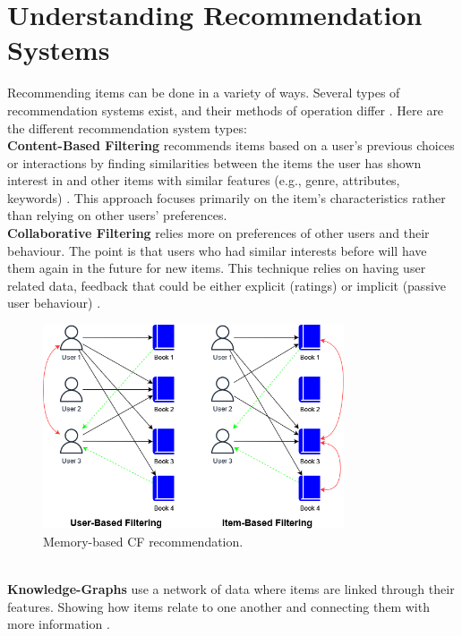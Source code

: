 \documentclass[conference]{IEEEtran}
\begin{document}
\section{Understanding Recommendation Systems}
Recommending items can be done in a variety of ways. Several types of recommendation systems exist, and their methods of operation differ \cite{Roy2022}. Here are the different recommendation system types:\\
%
%
\textbf{Content-Based Filtering} recommends items based on a user's previous choices or interactions by finding similarities between the items the user has shown interest in and other items with similar features (e.g., genre, attributes, keywords) \cite{pub.1034486657}.
This approach focuses primarily on the item's characteristics rather than relying on other users' preferences.\\
\textbf{Collaborative Filtering} relies more on preferences of other users and their behaviour. The point is that users who had similar interests before will have them again in the future for new items. This technique relies on having user related data, feedback that could be either explicit (ratings) or implicit (passive user behaviour) \cite{NILASHI2018507}.
%
\begin{figure}[!htb]
\centering
\includegraphics[width=3.5in]{img/collaborative_example.png}
\caption{Memory-based CF recommendation.}
\label{fig:collaborative_example}
\end{figure}\\
%
\textbf{Knowledge-Graphs} use a network of data where items are linked through their features. Showing how items relate to one another and connecting them with more information \cite{Imene2022488}.
\end{document}
